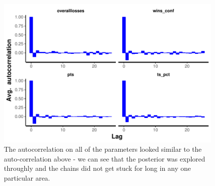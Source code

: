 \documentclass[10pt,a4paper, hidelinks]{article} %
\begin{document}
\begin{figure}[H]
	\centering
	\includegraphics[width=1\linewidth]{../fig/polr_autocorr}
	\caption{The autocorrelation on all of the parameters looked similar to the auto-correlation above - we can see that the posterior was explored throughly and the chains did not get stuck for long in any one particular area. }
	\label{fig:polr_autocorrelation}
\end{figure}

\end{document}
